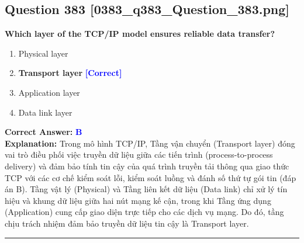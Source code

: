 \documentclass[11pt,a4paper]{article}
\begin{document}
\begin{minipage}{\textwidth}
\subsection*{Question 383 \quad \footnotesize{[0383\_q383\_Question\_383.png]}}
\noindent \textbf{Which layer of the TCP/IP model ensures reliable data transfer?}

\begin{enumerate}[label=\Alph*.]
    \item Physical layer
    \item \textbf{Transport layer} \hfill \textcolor{blue}{\textbf{[Correct]}}
    \item Application layer
    \item Data link layer
\end{enumerate}

\noindent \textbf{Correct Answer:} \textcolor{blue}{\textbf{B}} \\[2pt]
\noindent \textbf{Explanation:} Trong mô hình TCP/IP, Tầng vận chuyển (Transport layer) đóng vai trò điều phối việc truyền dữ liệu giữa các tiến trình (process-to-process delivery) và đảm bảo tính tin cậy của quá trình truyền tải thông qua giao thức TCP với các cơ chế kiểm soát lỗi, kiểm soát luồng và đánh số thứ tự gói tin (đáp án B). Tầng vật lý (Physical) và Tầng liên kết dữ liệu (Data link) chỉ xử lý tín hiệu và khung dữ liệu giữa hai nút mạng kế cận, trong khi Tầng ứng dụng (Application) cung cấp giao diện trực tiếp cho các dịch vụ mạng. Do đó, tầng chịu trách nhiệm đảm bảo truyền dữ liệu tin cậy là Transport layer.

\par\vspace{0.3cm}
\hrule
\vspace{0.3cm}
\end{minipage}
\end{document}
